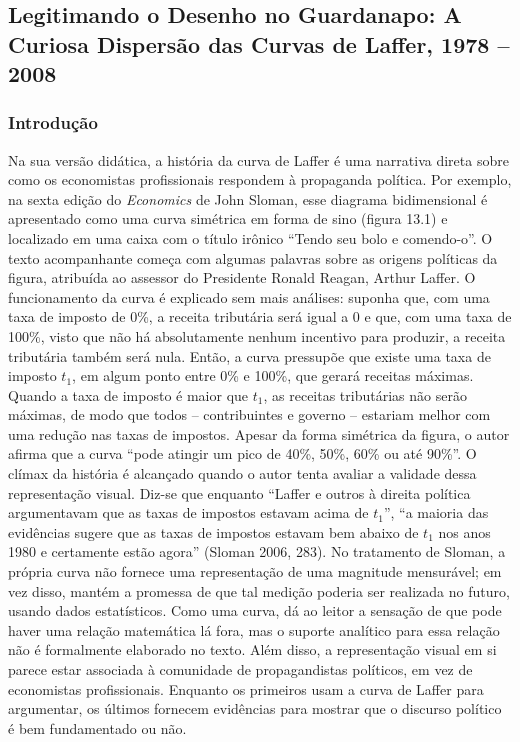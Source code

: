 \documentclass[a4paper,12pt]{article}[abntex2]
\begin{document}
\section{}

\subsection{\textbf{Legitimando o Desenho no Guardanapo: A Curiosa Dispersão das Curvas de Laffer, 1978 – 2008}}

\subsubsection{\textbf{Introdução}}

Na sua versão didática, a história da curva de Laffer é uma narrativa direta sobre como os economistas profissionais respondem à propaganda política. Por exemplo, na sexta edição do \textit{Economics} de John Sloman, esse diagrama bidimensional é apresentado como uma curva simétrica em forma de sino (figura 13.1) e localizado em uma caixa com o título irônico ``Tendo seu bolo e comendo-o''. O texto acompanhante começa com algumas palavras sobre as origens políticas da figura, atribuída ao assessor do Presidente Ronald Reagan, Arthur Laffer. O funcionamento da curva é explicado sem mais análises: suponha que, com uma taxa de imposto de 0\%, a receita tributária será igual a 0 e que, com uma taxa de 100\%, visto que não há absolutamente nenhum incentivo para produzir, a receita tributária também será nula. Então, a curva pressupõe que existe uma taxa de imposto $t_1$, em algum ponto entre 0\% e 100\%, que gerará receitas máximas. Quando a taxa de imposto é maior que $t_1$, as receitas tributárias não serão máximas, de modo que todos -- contribuintes e governo -- estariam melhor com uma redução nas taxas de impostos. Apesar da forma simétrica da figura, o autor afirma que a curva ``pode atingir um pico de 40\%, 50\%, 60\% ou até 90\%''. O clímax da história é alcançado quando o autor tenta avaliar a validade dessa representação visual. Diz-se que enquanto ``Laffer e outros à direita política argumentavam que as taxas de impostos estavam acima de $t_1$'', ``a maioria das evidências sugere que as taxas de impostos estavam bem abaixo de $t_1$ nos anos 1980 e certamente estão agora'' (Sloman 2006, 283). No tratamento de Sloman, a própria curva não fornece uma representação de uma magnitude mensurável; em vez disso, mantém a promessa de que tal medição poderia ser realizada no futuro, usando dados estatísticos. Como uma curva, dá ao leitor a sensação de que pode haver uma relação matemática lá fora, mas o suporte analítico para essa relação não é formalmente elaborado no texto. Além disso, a representação visual em si parece estar associada à comunidade de propagandistas políticos, em vez de economistas profissionais. Enquanto os primeiros usam a curva de Laffer para argumentar, os últimos fornecem evidências para mostrar que o discurso político é bem fundamentado ou não.
\end{document}
